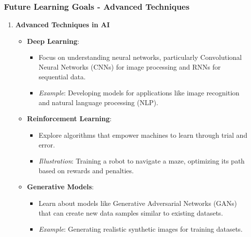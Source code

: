 \documentclass[aspectratio=169]{beamer}
\begin{document}
\begin{frame}[fragile]
    \frametitle{Future Learning Goals - Advanced Techniques}
    \begin{enumerate}
        \item \textbf{Advanced Techniques in AI}
        \begin{itemize}
            \item \textbf{Deep Learning}: 
            \begin{itemize}
                \item Focus on understanding neural networks, particularly Convolutional Neural Networks (CNNs) for image processing and RNNs for sequential data.
                \item \textit{Example}: Developing models for applications like image recognition and natural language processing (NLP).
            \end{itemize}

            \item \textbf{Reinforcement Learning}: 
            \begin{itemize}
                \item Explore algorithms that empower machines to learn through trial and error.
                \item \textit{Illustration}: Training a robot to navigate a maze, optimizing its path based on rewards and penalties.
            \end{itemize}
            
            \item \textbf{Generative Models}: 
            \begin{itemize}
                \item Learn about models like Generative Adversarial Networks (GANs) that can create new data samples similar to existing datasets.
                \item \textit{Example}: Generating realistic synthetic images for training datasets.
            \end{itemize}
        \end{itemize}
    \end{enumerate}
\end{frame}
\end{document}
